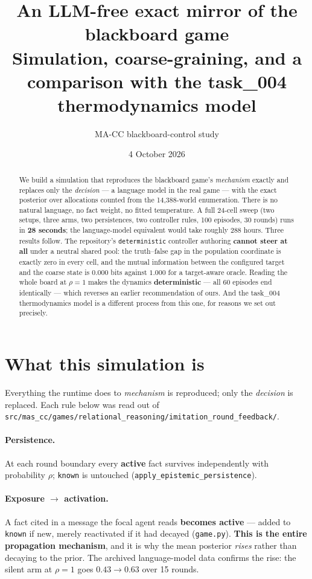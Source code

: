 \documentclass[11pt,a4paper]{article}
\title{\textbf{An LLM-free exact mirror of the blackboard game}\\[2mm]
\large Simulation, coarse-graining, and a comparison with the task\_004 thermodynamics model}
\author{MA-CC blackboard-control study}\date{4 October 2026}
\begin{document}
\maketitle

\begin{abstract}\noindent
We build a simulation that reproduces the blackboard game's \emph{mechanism}
exactly and replaces only the \emph{decision} --- a language model in the real
game --- with the exact posterior over allocations counted from the
14{,}388-world enumeration. There is no natural language, no fact weight, no
fitted temperature. A full 24-cell sweep (two setups, three arms, two
persistences, two controller rules, 100 episodes, 30 rounds) runs in
\textbf{28 seconds}; the language-model equivalent would take roughly 288 hours.
Three results follow. The repository's \texttt{deterministic} controller
authoring \textbf{cannot steer at all} under a neutral shared pool: the
truth--false gap in the population coordinate is exactly zero in every cell, and
the mutual information between the configured target and the coarse state is
$0.000$ bits against $1.000$ for a target-aware oracle. Reading the whole board
at $\rho=1$ makes the dynamics \textbf{deterministic} --- all 60 episodes end
identically --- which reverses an earlier recommendation of ours. And the
task\_004 thermodynamics model is a different process from this one, for
reasons we set out precisely.
\end{abstract}

\section{What this simulation is}

Everything the runtime does to \emph{mechanism} is reproduced; only the
\emph{decision} is replaced. Each rule below was read out of
\texttt{src/mas\_cc/games/relational\_reasoning/imitation\_round\_feedback/}.

\paragraph{Persistence.} At each round boundary every \textbf{active} fact
survives independently with probability $\rho$; \texttt{known} is untouched
(\texttt{apply\_epistemic\_persistence}).

\paragraph{Exposure $\to$ activation.} A fact cited in a message the focal agent
reads \textbf{becomes active} --- added to \texttt{known} if new, merely
reactivated if it had decayed (\texttt{game.py}). \textbf{This is the entire
propagation mechanism}, and it is why the mean posterior \emph{rises} rather
than decaying to the prior. The archived language-model data confirms the rise:
the silent arm at $\rho=1$ goes $0.43\to0.63$ over 15 rounds.
\end{document}
